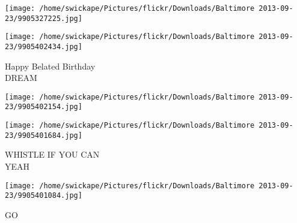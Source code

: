 \documentclass[10pt,letterpaper]{article}
\begin{document}
\texttt{[image: /home/swickape/Pictures/flickr/Downloads/Baltimore 2013-09-23/9905327225.jpg]}

\vspace{0.25in}
\texttt{[image: /home/swickape/Pictures/flickr/Downloads/Baltimore 2013-09-23/9905402434.jpg]}

Happy Belated Birthday\\
DREAM\\
\pagebreak

\texttt{[image: /home/swickape/Pictures/flickr/Downloads/Baltimore 2013-09-23/9905402154.jpg]}

\vspace{0.25in}
\texttt{[image: /home/swickape/Pictures/flickr/Downloads/Baltimore 2013-09-23/9905401684.jpg]}

WHISTLE IF YOU CAN\\
YEAH\\
\pagebreak

\texttt{[image: /home/swickape/Pictures/flickr/Downloads/Baltimore 2013-09-23/9905401084.jpg]}

GO\\
\pagebreak
\end{document}
